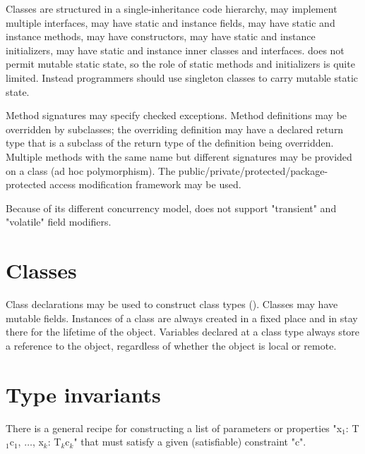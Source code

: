 Classes are structured in a single-inheritance code
hierarchy, may implement multiple interfaces, may have static and
instance fields, may have static and instance methods, may have
constructors, may have static and instance initializers, may have
static and instance inner classes and interfaces. \Xten{} does not
permit mutable static state, so the role of static methods and
initializers is quite limited. Instead programmers should use
singleton classes to carry mutable static state.

Method signatures may specify checked exceptions. Method definitions
may be overridden by subclasses; the overriding definition may have a
declared return type that is a subclass of the return type of the
definition being overridden. Multiple methods with the same name but
different signatures may be provided on a class (ad hoc
polymorphism). The public/private/protected/package-protected access
modification framework may be used.


Because of its different concurrency model, \Xten{} does not support
\xcd"transient" and \xcd"volatile" field modifiers.


\section{Classes}\label{ReferenceClasses}

Class declarations may
be used to construct class types (). Classes may
have mutable fields. Instances of a class are always created in a
fixed place and in \XtenCurrVer{} stay there for the lifetime of the
object.  Variables declared at a class type always store a reference
to the object, regardless of whether the object is local or remote.


\section{Type invariants}\label{DepType:Guard}

There is a general recipe for constructing a list of parameters or
properties \xcdmath"x$_1$: T$_1${c$_1$}, $\dots$, x$_k$: T$_k${c$_k$}" that must satisfy a given
(satisfiable) constraint \xcd"c". 

